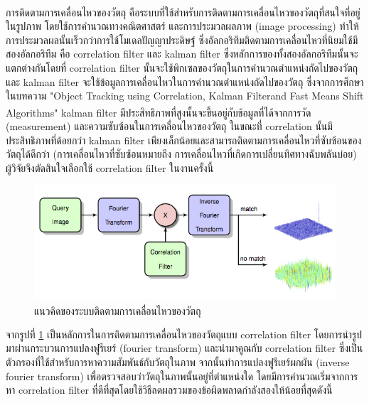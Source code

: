 การติดตามการเคลื่อนไหวของวัตถุ\textsuperscript{\cite{danelljan2014accurate}} คือระบบที่ใช้สำหรับการติดตามการเคลื่อนไหวของวัตถุที่สนใจที่อยู่ในรูปภาพ 
โดยใช้การคำนวณทางคณิตศาสตร์ และการประมวลผลภาพ (image processing) ทำให้การประมวลผลนั้นเร็วกว่าการใช้โมเดลปัญญาประดิษฐ์ ซึ่งอัลกอริทึมติดตามการเคลื่อนไหวที่นิยมใช้มีสองอัลกอริทึม
คือ correlation filter และ kalman filter ซึ่งหลักการของทั้งสองอัลกอริทึมนั้นจะแตกต่างกันโดยที่ correlation filter นั้นจะใช้พิกเซลของวัตถุในการคำนวณตำแหน่งถัดไปของวัตถุ 
และ kalman filter จะใช้ข้อมูลการเคลื่อนไหวในการคำนวณตำแหน่งถัดไปของวัตถุ ซึ่งจากการศึกษาในบทความ "Object Tracking using Correlation,
Kalman Filterand Fast Means Shift Algorithms"\textsuperscript{\cite{ali2006object}} kalman filter มีประสิทธิภาพที่สูงนั้นจะขึ้นอยู่กับข้อมูลที่ได้จากการวัด (measurement)
และความซับซ้อนในการเคลื่อนไหวของวัตถุ ในขณะที่ correlation นั้นมีประสิทธิภาพที่ด้อยกว่า kalman filter เพียงเล็กน้อยและสามารถติดตามการเคลื่อนไหวที่ซับซ้อนของวัตถุได้ดีกว่า 
(การเคลื่อนไหวที่ซับซ้อนหมายถึง การเคลื่อนไหวที่เกิดการเปลี่ยนทิศทางฉับพลันบ่อย) ผู้วิจัยจึงตัดสินใจเลือกใช้ correlation filter ในงานครั้งนี้
\begin{figure}[!ht]
	\centering
	\includegraphics[width=1\textwidth]{chapter2/images/track-concept.png}
		\caption[แนวคิดของระบบติดตามการเคลื่อนไหวของวัตถุ]{แนวคิดของระบบติดตามการเคลื่อนไหวของวัตถุ\textsuperscript{\cite{correlation_filter}}}
    	\label{fig:Track_concept}
\end{figure}

จากรูปที่ \ref{fig:Track_concept} เป็นหลักการในการติดตามการเคลื่อนไหวของวัตถุแบบ correlation filter โดยการนำรูปมาผ่านกระบวนการแปลงฟูรีเยร์ (fourier transform)
และนำมาคูณกับ correlation filter ซึ่งเป็นตัวกรองที่ใช้สำหรับการหาความสัมพันธ์กับวัตถุในภาพ จากนั้นทำการแปลงฟูรีเยร์ผกผัน (inverse fourier transform) 
เพื่อตรวจสอบว่าวัตถุในภาพนั้นอยู่ที่ตำแหน่งใด โดยมีการคำนวณเริ่มจากการหา correlation filter ที่ดีที่สุดโดยใช้วิธีลดผลรวมของข้อผิดพลาดกำลังสองให้น้อยที่สุดดังนี้

